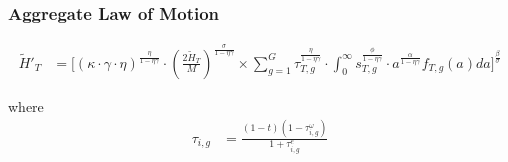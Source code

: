 \documentclass[11pt,hyperref={bookmarks=false},table,aspectratio=169]{beamer}
\begin{document}
\begin{frame}
	\frametitle{Aggregate Law of Motion} 
	\label{laws}
	\small
	\begin{align}
		\widetilde{H}'_{T} & = \Bigg[ \left(\kappa \cdot \gamma \cdot \eta\right)^{\frac{\eta}{1-\eta\gamma}} \cdot \left(\tfrac{2\widetilde{H}_T}{M}\right)^{\frac{\sigma}{1-\eta\gamma}} \times \sum_{g=1}^G \tau_{T,g}^\frac{\eta}{1-\eta\gamma} \cdot \int_0^\infty  s_{T,g}^\frac{\phi}{1-\eta\gamma} \cdot a^\frac{\alpha}{1-\eta\gamma}  f_{T,g}(a)da \Bigg]^\frac{\beta}{\sigma} \nonumber  
	\end{align}
		
		
	where
	\begin{align}
		\tau_{i,g} & =\frac{(1-t)(1-\tau^{\omega}_{i,g})}{1+\tau^e_{i,g}} \nonumber
	\end{align}
	\hfill \hyperlink{eqm}{}
\end{frame}
\end{document}
